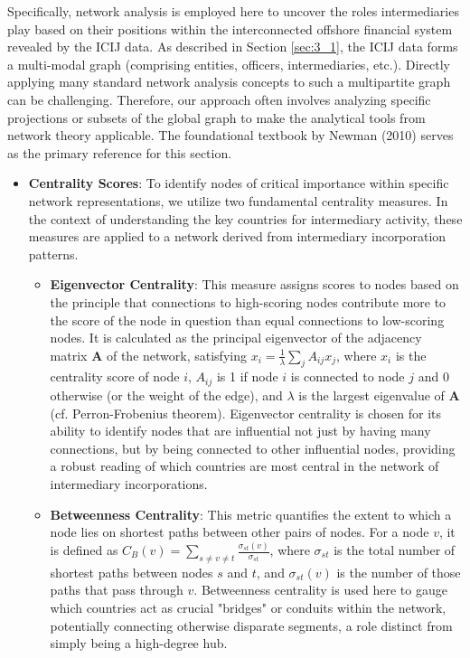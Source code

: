 Specifically, network analysis is employed here to uncover the roles intermediaries play based on their positions within the interconnected offshore financial system revealed by the ICIJ data. As described in Section \ref{sec:3_1}, the ICIJ data forms a multi-modal graph (comprising entities, officers, intermediaries, etc.). Directly applying many standard network analysis concepts to such a multipartite graph can be challenging. Therefore, our approach often involves analyzing specific projections or subsets of the global graph to make the analytical tools from network theory applicable. The foundational textbook by Newman (2010) serves as the primary reference for this section.

\begin{itemize}
    \item \textbf{Centrality Scores}: To identify nodes of critical importance within specific network representations, we utilize two fundamental centrality measures. In the context of understanding the key countries for intermediary activity, these measures are applied to a network derived from intermediary incorporation patterns.
    \begin{itemize}
        \item \textbf{Eigenvector Centrality}: This measure assigns scores to nodes based on the principle that connections to high-scoring nodes contribute more to the score of the node in question than equal connections to low-scoring nodes. It is calculated as the principal eigenvector of the adjacency matrix $\mathbf{A}$ of the network, satisfying $x_i = \frac{1}{\lambda} \sum_{j} A_{ij} x_j$, where $x_i$ is the centrality score of node $i$, $A_{ij}$ is 1 if node $i$ is connected to node $j$ and 0 otherwise (or the weight of the edge), and $\lambda$ is the largest eigenvalue of $\mathbf{A}$ (cf. Perron-Frobenius theorem). Eigenvector centrality is chosen for its ability to identify nodes that are influential not just by having many connections, but by being connected to other influential nodes, providing a robust reading of which countries are most central in the network of intermediary incorporations.
        \item \textbf{Betweenness Centrality}: This metric quantifies the extent to which a node lies on shortest paths between other pairs of nodes. For a node $v$, it is defined as $C_B(v) = \sum_{s \neq v \neq t} \frac{\sigma_{st}(v)}{\sigma_{st}}$, where $\sigma_{st}$ is the total number of shortest paths between nodes $s$ and $t$, and $\sigma_{st}(v)$ is the number of those paths that pass through $v$. Betweenness centrality is used here to gauge which countries act as crucial "bridges" or conduits within the network, potentially connecting otherwise disparate segments, a role distinct from simply being a high-degree hub.
    \end{itemize}


\end{itemize}
